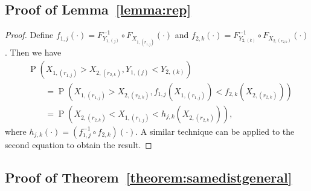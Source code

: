 \documentclass[12pt]{article}
\DeclareMathOperator*{\Prob}{P}
\begin{document}
\subsection{Proof of Lemma~\ref{lemma:rep}}

\begin{proof}
Define $f_{1,j}(\cdot) = F_{Y_{1, (j)}}^{-1} \circ F_{X_{1,(r_{1,j})}} (\cdot)$ and 
$f_{2,k}(\cdot) = F_{Y_{2, (k)}}^{-1} \circ F_{X_{2,(r_{2,k})}} (\cdot)$. Then we have 
\begin{align*}
  &\Prob\left(X_{1,(r_{1,j})} > X_{2,(r_{2,k})}, Y_{1,(j)} < Y_{2,(k)}\right) \\
  &\qquad= \Prob\left(X_{1,(r_{1,j})} > X_{2,(r_{2,k})}, f_{1,j}(X_{1,(r_{1,j})}) < f_{2,k}(X_{2,(r_{2,k})})\right) \\
  &\qquad= \Prob\left( X_{2,(r_{2,k})} < X_{1,(r_{1,j})}  < h_{j,k}\left(X_{2,(r_{2,k})}\right)\right),
\end{align*}
where $h_{j,k}(\cdot) = (f_{1,j}^{-1} \circ f_{2,k})(\cdot)$. %
A similar technique can be applied to the second equation to obtain the result.
\end{proof}


\subsection{Proof of Theorem~\ref{theorem:samedistgeneral}} 
\end{document}
